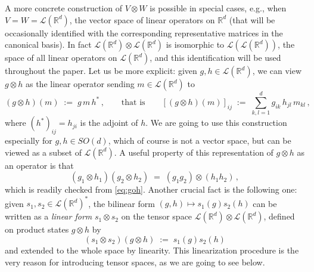 \documentclass[a4paper,reqno,11pt]{amsart}
\numberwithin{equation}{section}
\newcommand{\cL}{{\ensuremath{\mathcal L}} }
\newcommand{\R}{\mathbb{R}}
\begin{document}
A more concrete construction of $V \otimes W$ is possible
in special cases, e.g., when $V = W = \cL(\R^d)$,
the vector space of linear operators on $\R^d$ (that will be
occasionally identified with the corresponding representative
matrices in the canonical basis). 
In fact $\cL(\R^d) \otimes \cL(\R^d)$ is isomorphic to
$\cL(\cL(\R^d))$,
the space of all linear operators on $\cL(\R^d)$, and this
identification will be used throughout the paper.
Let us be more explicit: given $g,h \in \cL(\R^d)$,
we can view $g \otimes h$ as the linear operator sending $m \in \cL(\R^d)$ to
\begin{equation} \label{eq:goh}
	(g \otimes h) (m) \;:=\; g \, m \, h^* \,, 
	\qquad \text{that is} \qquad
	[(g \otimes h) (m)]_{ij} \;:=\; \sum_{k,l = 1}^d
	g_{ik} \, h_{jl} \, m_{kl}\,,
\end{equation}
where $(h^*)_{ij} =  h_{ji}$ is the adjoint of $h$. 
We are going to use this construction especially for $g, h \in SO(d)$, which of course
is not a vector space, but can be viewed as a subset of $\cL(\R^d)$.
A useful property of this representation of $g \otimes h$
as an operator is that
\begin{equation} \label{eq:comp}
	(g_1 \otimes h_1)(g_2 \otimes h_2) \;=\; (g_1 g_2) \otimes (h_1 h_2)\,,
\end{equation}
which is readily checked from \eqref{eq:goh}.
Another crucial fact is the following one: given 
$s_1, s_2 \in \cL(\R^d)^*$, the bilinear form
$(g,h) \mapsto s_1(g) s_2(h)$ can be written as a {\sl linear form}
$s_1 \otimes s_2$ on the tensor space $\cL(\R^d) \otimes \cL(\R^d)$, 
defined on product states $g \otimes h$ by
\begin{equation} \label{eq:tensorlin}
	(s_1 \otimes s_2)(g \otimes h) \;:=\; s_1(g) s_2(h)
\end{equation}
and extended to the whole space by linearity.
This linearization procedure is the very reason for introducing
tensor spaces, as we are going to see below.
\end{document}

